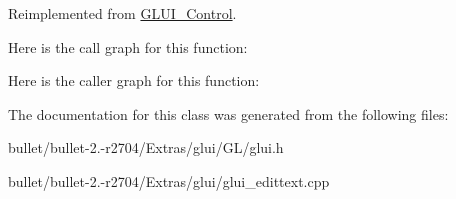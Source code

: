 Reimplemented from \hyperlink{class_g_l_u_i___control_a44fab5a8af3c58865bc2cd8bfd596af8}{G\+L\+U\+I\+\_\+\+Control}.



Here is the call graph for this function\+:




Here is the caller graph for this function\+:




The documentation for this class was generated from the following files\+:\begin{DoxyCompactItemize}
\item 
bullet/bullet-\/2.-\/r2704/\+Extras/glui/\+G\+L/glui.\+h\item 
bullet/bullet-\/2.-\/r2704/\+Extras/glui/glui\+\_\+edittext.\+cpp\end{DoxyCompactItemize}
